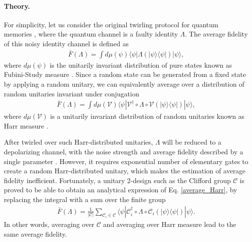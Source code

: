 \documentclass[prl,twocolumn,showpacs]{revtex4-1}
\newcommand{\bra}[1]{\langle #1|}
\newcommand{\ket}[1]{|#1\rangle}
\begin{document}
\paragraph*{Theory.}
For simplicity, let us consider the original twirling protocol for quantum memories \cite{Emerson2007}, where the quantum channel is a faulty identity $\Lambda$. The average fidelity of this noisy identity channel is defined as
\begin{align} \label{average_fidelity}
\bar{F}(\Lambda) = \int d\mu(\psi) \bra{\psi} \Lambda (\ket{\psi} \bra{\psi}) \ket{\psi},
\end{align}
where $d\mu(\psi)$ is the unitarily invariant distribution of pure states known as Fubini-Study measure \cite{Emerson2005}. Since a random state can be generated from a fixed state by applying a random unitary, we can equivalently average over a distribution of random unitaries invariant under conjugation
\begin{align} \label{average_Harr}
\bar{F}(\Lambda) = \int d\mu(\mathcal{V}) \bra{\psi} \mathcal{V}^{\dagger} \circ \Lambda \circ  \mathcal{V}(\ket{\psi} \bra{\psi}) \ket{\psi},
\end{align}
where $d\mu(\mathcal{V})$ is a unitarily invariant distribution of random unitaries known as Harr measure \cite{Emerson2005}.

After twirled over such Harr-distributed unitaries, $\Lambda$ will be reduced to a depolarizing channel, with the noise strength and average fidelity described by a single parameter \cite{Emerson2007}. However, it requires exponential number of  elementary gates to create a random Harr-distributed unitary, which makes the estimation of average fidelity inefficient. Fortunately, a unitary 2-design \cite{Dankert2009} such as the  Clifford group $\mathcal{C}$ is proved to be able to obtain an analytical expression of Eq. \ref{average_Harr}, by replacing the integral with a sum over the finite group
\begin{align} \label{average_Clifford}
\bar{F}(\Lambda) = \frac{1}{|\mathcal{C}|}\sum_{\mathcal{C}_i\in \mathcal{C}} \bra{\psi} \mathcal{C}_i^{\dagger} \circ \Lambda \circ \mathcal{C}_i(\ket{\psi} \bra{\psi}) \ket{\psi}.
\end{align}
In other words, averaging over $\mathcal{C}$ and averaging over Harr measure lead to the same average fidelity.
\end{document}
